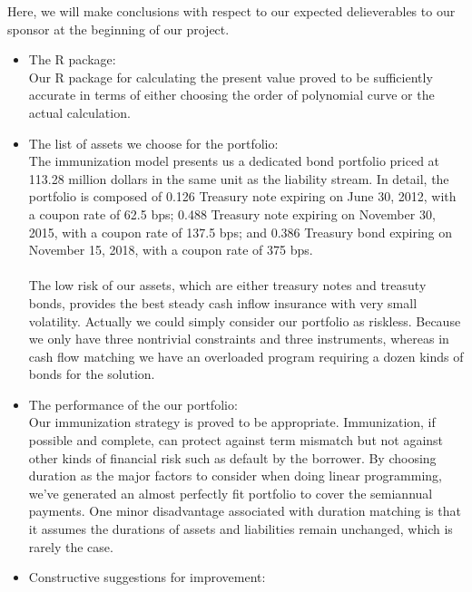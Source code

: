 \documentclass[oneside,12pt]{report}
\begin{document}
{Here, we will make conclusions with respect to our expected delieverables to our sponsor at the beginning of our project.
\begin{itemize}
\item The R package:\vspace{1mm}
\\
Our R package for calculating the present value proved to be sufficiently accurate in terms of either choosing the order of polynomial curve or the actual calculation.\\
\item The list of assets we choose for the portfolio:\vspace{1mm}
\\
The immunization model presents us a dedicated bond portfolio priced at 113.28 million dollars in the same unit as the liability stream. In detail, the portfolio is composed of 0.126 Treasury note expiring on June 30, 2012, with a coupon rate of 62.5 bps; 0.488 Treasury note expiring on November 30, 2015, with a coupon rate of 137.5 bps; and 0.386 Treasury bond expiring on November 15, 2018, with a coupon rate of 375 bps.\\
\\
The low risk of our assets, which are either treasury notes and treasuty bonds, provides the best steady cash inflow insurance with very small volatility. Actually we could simply consider our portfolio as riskless. Because we only have three nontrivial constraints and three instruments, whereas in cash flow matching we have an overloaded program requiring a dozen kinds of bonds for the solution.\\
\item The performance of the our portfolio:\vspace{1mm}
\\
Our immunization strategy is proved to be appropriate. Immunization, if possible and complete, can protect against term mismatch but not against other kinds of financial risk such as default by the borrower. By choosing duration as the major factors to consider when doing linear programming, we've generated an almost perfectly fit portfolio to cover the semiannual payments. One minor disadvantage associated with duration matching is that it assumes the durations of assets and liabilities remain unchanged, which is rarely the case.\\
    \item Constructive suggestions for improvement:\vspace{1mm}
\\

\end{itemize}}
\end{document}
